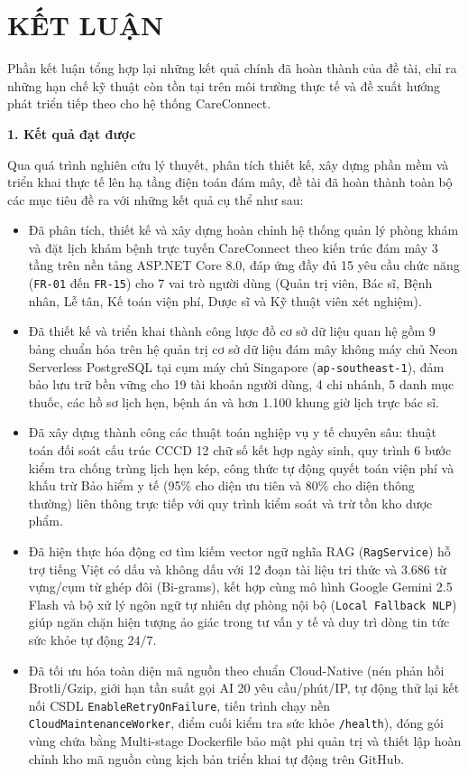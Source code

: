 \chapter*{KẾT LUẬN}

Phần kết luận tổng hợp lại những kết quả chính đã hoàn thành của đề tài, chỉ ra những hạn chế kỹ thuật còn tồn tại trên môi trường thực tế và đề xuất hướng phát triển tiếp theo cho hệ thống CareConnect.

\textbf{1. Kết quả đạt được}

Qua quá trình nghiên cứu lý thuyết, phân tích thiết kế, xây dựng phần mềm và triển khai thực tế lên hạ tầng điện toán đám mây, đề tài đã hoàn thành toàn bộ các mục tiêu đề ra với những kết quả cụ thể như sau:
\begin{itemize}
    \item Đã phân tích, thiết kế và xây dựng hoàn chỉnh hệ thống quản lý phòng khám và đặt lịch khám bệnh trực tuyến CareConnect theo kiến trúc đám mây 3 tầng trên nền tảng ASP.NET Core 8.0, đáp ứng đầy đủ 15 yêu cầu chức năng (\texttt{FR-01} đến \texttt{FR-15}) cho 7 vai trò người dùng (Quản trị viên, Bác sĩ, Bệnh nhân, Lễ tân, Kế toán viện phí, Dược sĩ và Kỹ thuật viên xét nghiệm).
    \item Đã thiết kế và triển khai thành công lược đồ cơ sở dữ liệu quan hệ gồm 9 bảng chuẩn hóa trên hệ quản trị cơ sở dữ liệu đám mây không máy chủ Neon Serverless PostgreSQL tại cụm máy chủ Singapore (\texttt{ap-southeast-1}), đảm bảo lưu trữ bền vững cho 19 tài khoản người dùng, 4 chi nhánh, 5 danh mục thuốc, các hồ sơ lịch hẹn, bệnh án và hơn 1.100 khung giờ lịch trực bác sĩ.
    \item Đã xây dựng thành công các thuật toán nghiệp vụ y tế chuyên sâu: thuật toán đối soát cấu trúc CCCD 12 chữ số kết hợp ngày sinh, quy trình 6 bước kiểm tra chống trùng lịch hẹn kép, công thức tự động quyết toán viện phí và khấu trừ Bảo hiểm y tế (95\% cho diện ưu tiên và 80\% cho diện thông thường) liên thông trực tiếp với quy trình kiểm soát và trừ tồn kho dược phẩm.
    \item Đã hiện thực hóa động cơ tìm kiếm vector ngữ nghĩa RAG (\texttt{RagService}) hỗ trợ tiếng Việt có dấu và không dấu với 12 đoạn tài liệu tri thức và 3.686 từ vựng/cụm từ ghép đôi (Bi-grams), kết hợp cùng mô hình Google Gemini 2.5 Flash và bộ xử lý ngôn ngữ tự nhiên dự phòng nội bộ (\texttt{Local Fallback NLP}) giúp ngăn chặn hiện tượng ảo giác trong tư vấn y tế và duy trì dòng tin tức sức khỏe tự động $24/7$.
    \item Đã tối ưu hóa toàn diện mã nguồn theo chuẩn Cloud-Native (nén phản hồi Brotli/Gzip, giới hạn tần suất gọi AI 20 yêu cầu/phút/IP, tự động thử lại kết nối CSDL \texttt{EnableRetryOnFailure}, tiến trình chạy nền \texttt{CloudMaintenanceWorker}, điểm cuối kiểm tra sức khỏe \texttt{/health}), đóng gói vùng chứa bằng Multi-stage Dockerfile bảo mật phi quản trị và thiết lập hoàn chỉnh kho mã nguồn cùng kịch bản triển khai tự động trên GitHub.
\end{itemize}

